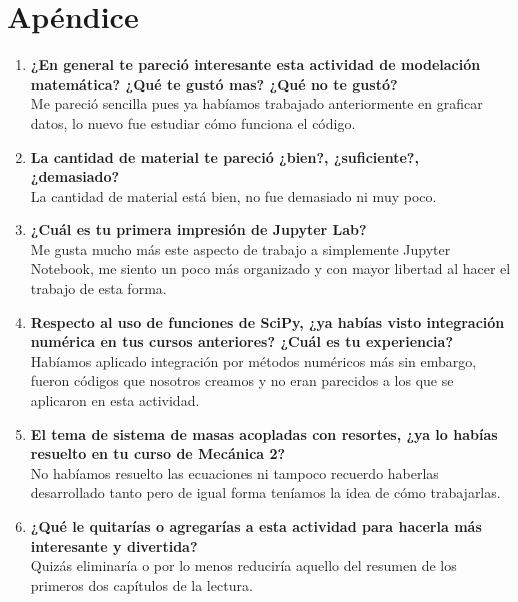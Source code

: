 \section{Apéndice}
\begin{enumerate}
\item \textbf{¿En general te pareció interesante esta actividad de modelación matemática? ¿Qué te gustó mas? ¿Qué no te gustó?}
\medskip
\\ Me pareció sencilla pues ya habíamos trabajado anteriormente en graficar datos, lo nuevo fue estudiar cómo funciona el código.

\item \textbf{La cantidad de material te pareció ¿bien?, ¿suficiente?, ¿demasiado?}
\medskip
\\ La cantidad de material está bien, no fue demasiado ni muy poco.

\item \textbf{¿Cuál es tu primera impresión de Jupyter Lab?}
\medskip
\\ Me gusta mucho más este aspecto de trabajo a simplemente Jupyter Notebook, me siento un poco más organizado y con mayor libertad al hacer el trabajo de esta forma.

\item \textbf{Respecto al uso de funciones de SciPy, ¿ya habías visto integración numérica en tus cursos anteriores? ¿Cuál es tu experiencia?}
\medskip
\\ Habíamos aplicado integración por métodos numéricos más sin embargo, fueron códigos que nosotros creamos y no eran parecidos a los que se aplicaron en esta actividad.

\item \textbf{El tema de sistema de masas acopladas con resortes, ¿ya lo habías resuelto en tu curso de Mecánica 2?}  
\medskip
\\ No habíamos resuelto las ecuaciones ni tampoco recuerdo haberlas desarrollado tanto pero de igual forma teníamos la idea de cómo trabajarlas.

\item \textbf{¿Qué le quitarías o agregarías a esta actividad para hacerla más interesante y divertida?}
\medskip
\\ Quizás eliminaría o por lo menos reduciría aquello del resumen de los primeros dos capítulos de la lectura.

\end{enumerate}

